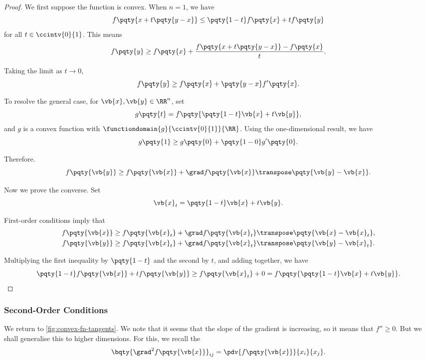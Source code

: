 \begin{proof}
    We first suppose the function is convex. When \(n = 1\), we have
    \[
        f\pqty{x + t \pqty{y - x}} \leq \pqty{1 - t} f\pqty{x} + t f\pqty{y}
    \]
    for all \(t \in \ccintv{0}{1}\). This means
    \[
        f\pqty{y} \geq f\pqty{x} + \frac{f\pqty{x + t \pqty{y - x}} - f\pqty{x}}{t}.
    \]

    Taking the limit as \(t \to 0\),
    \[
        f\pqty{y} \geq f\pqty{x} + \pqty{y - x} f'\pqty{x}.
    \]

    To resolve the general case, for \(\vb{x}, \vb{y} \in \RR^n\), set
    \[
        g\pqty{t} = f\pqty{\pqty{1 - t} \vb{x} + t \vb{y}},
    \]  
    and \(g\) is a convex function with \(\functiondomain{g}{\ccintv{0}{1}}{\RR}\). Using the one-dimensional result, we have
    \[
        g\pqty{1} \geq g\pqty{0} + \pqty{1 - 0} g'\pqty{0}.
    \]

    Therefore.
    \[
        f\pqty{\vb{y}} \geq f\pqty{\vb{x}} + \grad f\pqty{\vb{x}} \transpose \pqty{\vb{y} - \vb{x}}.
    \]

    Now we prove the converse. Set
    \[
        \vb{x}_t = \pqty{1 - t} \vb{x} + t\vb{y}.
    \]

    First-order conditions imply that
    \begin{align*}
        f\pqty{\vb{x}} &\geq f\pqty{\vb{x}_t} + \grad f\pqty{\vb{x}_t} \transpose \pqty{\vb{x} - \vb{x}_t}, \\
        f\pqty{\vb{y}} &\geq f\pqty{\vb{x}_t} + \grad f\pqty{\vb{x}_t} \transpose \pqty{\vb{y} - \vb{x}_t}.
    \end{align*}

    Multiplying the first inequality by \(\pqty{1 - t}\) and the second by \(t\), and adding together, we have
    \[
        \pqty{1 - t} f\pqty{\vb{x}} + t f\pqty{\vb{y}} \geq f\pqty{\vb{x}_t} + 0 = f\pqty{\pqty{1 - t} \vb{x} + t \vb{y}}.
    \]
\end{proof}

\subsubsection{Second-Order Conditions}

We return to \autoref{fig:convex-fn-tangents}. We note that it seems that the slope of the gradient is increasing, so it means that \(f'' \geq 0\). But we shall generalise this to higher dimensions. For this, we recall the 
\[
    \bqty{\grad^2 f\pqty{\vb{x}}}_{ij} = \pdv{f\pqty{\vb{x}}}{x_i}{x_j}.
\]

